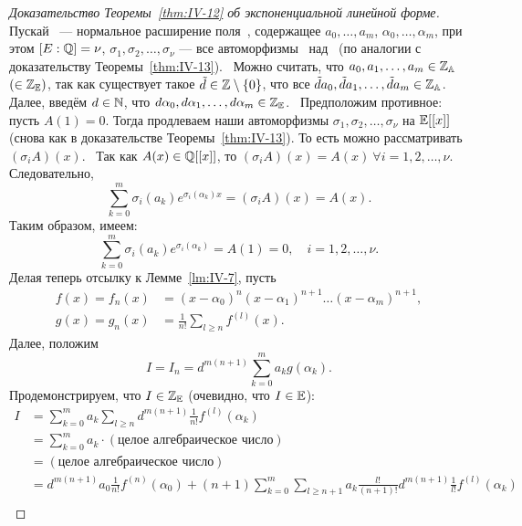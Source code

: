 \begin{proof}[Доказательство Теоремы~\ref{thm:IV-12} об экспоненциальной линейной форме]~\newline
    Пускай \EE~--- нормальное расширение поля~\QQ, содержащее $a_0, \dots, a_m$, $\alpha_0, \dots, \alpha_m$, при этом $[E : \mathbb{Q}] = \nu$, $\sigma_1, \sigma_2, \dots, \sigma_\nu$ --- все автоморфизмы \EE~над \QQ~(по аналогии с доказательству Теоремы~\ref{thm:IV-13}).~\newline
    Можно считать, что $a_0, a_1, \dots, a_m \in \mathbb{Z}_{\mathbb{A}}$ $(\in \mathbb{Z}_{\mathbb{E}})$, так как существует такое $\tilde{d} \in \mathbb{Z} \setminus \{ 0 \}$, что все $\tilde{d}a_0, \tilde{d}a_1, \dots, \tilde{d}a_m \in \mathbb{Z}_{\mathbb{A}}$. Далее, введём $d \in \mathbb{N}$, что $d\alpha_0, d\alpha_1, \dots, d\alpha_m \in \mathbb{Z}_{\mathbb{E}}$.~\newline
    Предположим противное: пусть $A(1) = 0$. Тогда продлеваем наши автоморфизмы $\sigma_1, \sigma_2, \dots, \sigma_\nu$ на $\mathbb{E}[[x]]$ (снова как в доказательстве Теоремы~\ref{thm:IV-13}). То есть можно рассматривать $\left( \sigma_iA \right)(x)$.~\newline
    Так как $A(x) \in \mathbb{Q}[[x]]$, то $\left( \sigma_iA \right)(x) = A(x) \ \forall i = 1, 2, \dots, \nu$. Следовательно, 
    \[
        \sum_{k=0}^m \sigma_i \left(a_k\right) e^{\sigma_i(\alpha_k)x} = (\sigma_iA)(x) = A(x).
    \]
    Таким образом, имеем:
    \[
        \sum_{k=0}^m \sigma_i\left(a_k\right)e^{\sigma_i\left(\alpha_k\right)} = A(1) = 0, \quad i = 1, 2, \dots, \nu.
    \]
    Делая теперь отсылку к Лемме~\ref{lm:IV-7}, пусть
    \begin{align*}
        f(x) = f_n(x) &= \left(x-\alpha_0\right)^n \left(x-\alpha_1\right)^{n+1} \dots \left(x-\alpha_m\right)^{n+1}, \\
        g(x) = g_n(x) &= \frac{1}{n!} \sum_{l \ge n} f^{(l)}(x).
    \end{align*} 
    Далее, положим
    \[
        I = I_n = d^{m(n+1)} \sum_{k=0}^m a_k g\left(\alpha_k\right).
    \]
    Продемонстрируем, что $I \in \mathbb{Z}_{\mathbb{E}}$ (очевидно, что $I \in \mathbb{E}$):
    \begin{align*}
        I &= \sum_{k=0}^m a_k \sum_{l \ge n} d^{m(n+1)}\frac{1}{n!}f^{(l)}\left(\alpha_k\right) \\
        &= \sum_{k=0}^m a_k \cdot (\text{целое алгебраическое число}) \\
        &= (\text{целое алгебраическое число}) \\
        &= d^{m(n+1)}a_0\frac{1}{n!}f^{(n)}\left(\alpha_0\right) + (n+1)\sum_{k=0}^m \sum_{l \ge n+1} a_k \frac{l!}{(n+1)!}d^{m(n+1)} \frac{1}{l!} f^{(l)}\left(\alpha_k\right) \\

\end{align*}
\end{proof}
